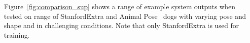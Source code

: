 Figure~\ref{fig:comparison_sup} shows a range of example system outputs when tested on range of StanfordExtra and Animal Pose~\cite{animalpose} dogs with varying pose and shape and in challenging conditions. Note that only StanfordExtra is used for training.


% 

% 

% 

